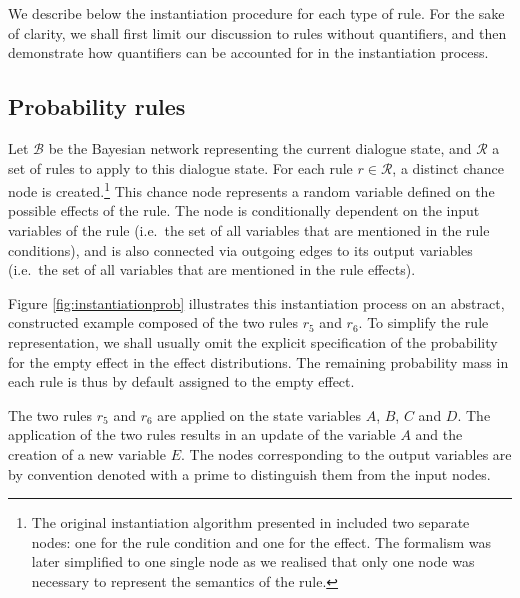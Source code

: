 We describe below the instantiation procedure for each type of rule. For the sake of clarity, we shall first limit our discussion to rules without quantifiers, and then demonstrate how quantifiers can be accounted for in the instantiation process. 

\subsection{Probability rules}
\label{sec:probruleinstantiation}

Let $\mathcal{B}$ be the Bayesian network representing the current dialogue state, and $\mathcal{R}$ a set of rules to apply to this dialogue state.  For each rule $r \in \mathcal{R}$, a distinct chance node is created.\footnote{The original instantiation algorithm presented in \citep{rulebasedmodels-sigdial2012} included two separate nodes: one for the rule condition and one for the effect.  The formalism was later simplified to one single node as we realised that only one node was necessary to represent the semantics of the rule.} This chance node represents a random variable defined on the possible effects of the rule.  The node is conditionally dependent on the input variables of the rule (i.e.\ the set of all variables that are mentioned in the rule conditions), and is also connected via outgoing edges to its output variables (i.e.\ the set of all variables that are mentioned in the rule effects). 

Figure \ref{fig:instantiationprob} illustrates this instantiation process on an abstract, constructed example composed of the two rules $r_5$ and $r_6$.  To simplify the rule representation, we shall usually omit the explicit specification of the probability for the empty effect in the effect distributions.  The remaining probability mass in each rule is thus by default assigned to the empty effect.

The two rules $r_5$ and $r_6$ are applied on the state variables $A$, $B$, $C$ and $D$.  The application of the two rules results in an update of the variable $A$ and the creation of a new variable $E$. The nodes corresponding to the output variables are by convention denoted with a prime to distinguish them from the input nodes.  

